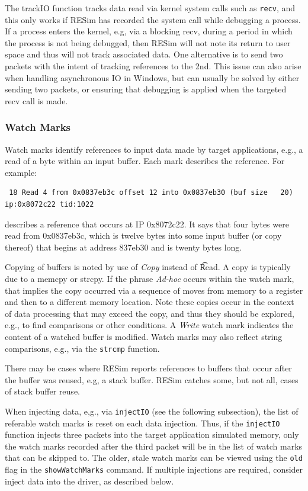 \documentclass[titlepage]{article}
\begin{document}
The trackIO function tracks data read via kernel system calls such as {\tt recv}, and this only works if RESim has recorded the system call while debugging a process.
If a process enters the kernel, e.g, via a blocking recv, during a period in which the process is not being debugged, then RESim will not note its return
to user space and thus will not track associated data.  One alternative is to send two packets with the intent of tracking references to the 2nd.
This issue can also arise when handling asynchronous IO in Windows, but can usually be solved by either sending two packets, or ensuring that debugging
is applied when the targeted recv call is made.


\subsubsection{Watch Marks}
\label{watch-marks}
Watch marks identify references to input data made by target applications, e.g., a read of a byte within an input buffer.  Each mark describes the reference.  For example:

\begin{verbatim}
 18 Read 4 from 0x0837eb3c offset 12 into 0x0837eb30 (buf size   20)   ip:0x8072c22 tid:1022
\end{verbatim}
\noindent describes a reference that occurs at IP 0x8072c22.  It says that four bytes were read from 0x0837eb3c, which is twelve bytes into some input buffer
(or copy thereof) that begins at address 837eb30 and is twenty bytes long.

Copying of buffers is noted by use of \textit{Copy} instead of \t{Read}.  A copy is typically due to a memcpy or strcpy.  If the phrase \textit{Ad-hoc} occurs
within the watch mark, that implies the copy occurred via a sequence of moves from memory to a register and then to a different memory location.  Note these copies occur
in the context of data processing that may exceed the copy, and thus they should be explored, e.g., to find comparisons or other conditions.
A \textit{Write} watch mark indicates the content of a watched buffer is modified.  Watch marks may also reflect string comparisons, e.g., via the {\tt strcmp}
function.

There may be cases where RESim reports references to buffers that occur after the buffer was reused, e.g, a stack buffer.  RESim catches some, but not all,
cases of stack buffer reuse.

When injecting data, e,g., via {\tt injectIO} (see the following subsection), the list of referable watch marks is reset on each data injection.  Thus, if the {\tt injectIO} function injects
three packets into the target application simulated memory, only the watch marks recorded after the third packet will be in 
the list of watch marks that can be skipped to.  The older, stale watch marks can
be viewed using the {\tt old} flag in the {\tt showWatchMarks} command.  If multiple injections are required, consider inject data into the driver, as described below.
\end{document}
